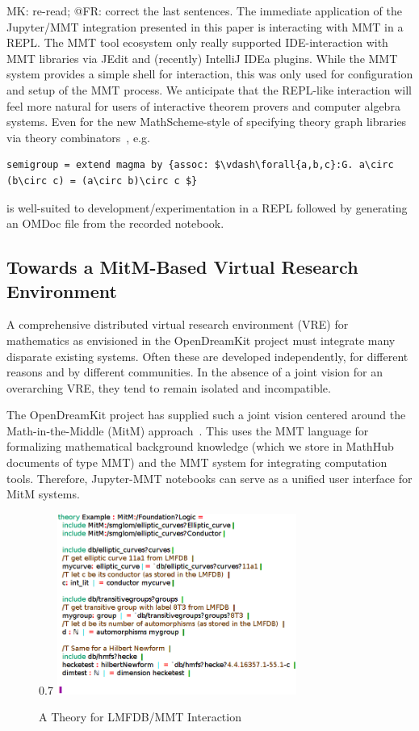 \begin{newpart}{MK: re-read; @FR: correct the last sentences.}
  The immediate application of the Jupyter/MMT integration presented in this paper is interacting with MMT in a REPL.
  The MMT tool ecosystem only really supported IDE-interaction with MMT libraries via JEdit and (recently) IntelliJ IDEa plugins. 
  While the MMT system provides a simple shell for interaction, this was only used for configuration and setup of the MMT process.
  We anticipate that the REPL-like interaction will feel more natural for users of interactive theorem provers and computer algebra systems.
  Even for the new MathScheme-style of specifying theory graph libraries via theory combinators~\cite{RabSha:????19}, e.g. 
\begin{lstlisting}[mathescape]
semigroup = extend magma by {assoc: $\vdash\forall{a,b,c}:G. a\circ (b\circ c) = (a\circ b)\circ c $}
\end{lstlisting}
  is well-suited to development/experimentation in a REPL followed by generating an OMDoc file from the recorded notebook.  
\end{newpart}

\subsection{Towards a MitM-Based Virtual Research Environment}


A comprehensive distributed virtual research environment (VRE) for mathematics as envisioned in the OpenDreamKit project must integrate many disparate existing systems.
Often these are developed independently, for different reasons and by different communities.
In the absence of a joint vision for an overarching VRE, they tend to remain isolated and incompatible.

The OpenDreamKit project has supplied such a joint vision centered around the Math-in-the-Middle (MitM) approach~\cite{DehKohKon:iop16}.
This uses the MMT language for formalizing mathematical background knowledge (which we store in MathHub documents of type MMT) and the MMT system for integrating computation tools.
Therefore, Jupyter-MMT notebooks can serve as a unified user interface for MitM systems.

\begin{figure}[r]{0.7\textwidth}
  \includegraphics[width=0.7\textwidth]{../D4.11/hecke}
  \caption{A Theory for LMFDB/MMT Interaction}\label{fig:hecke}
\end{figure}

